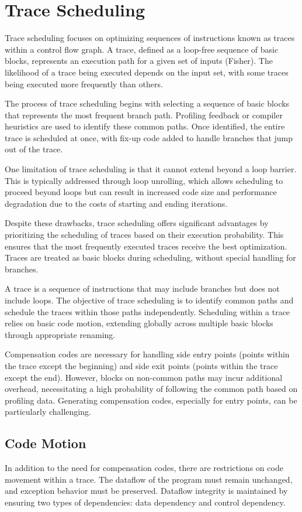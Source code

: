 \section{Trace Scheduling}

Trace scheduling focuses on optimizing sequences of instructions known as traces within a control flow graph. 
A trace, defined as a loop-free sequence of basic blocks, represents an execution path for a given set of inputs (Fisher). 
The likelihood of a trace being executed depends on the input set, with some traces being executed more frequently than others.

The process of trace scheduling begins with selecting a sequence of basic blocks that represents the most frequent branch path. 
Profiling feedback or compiler heuristics are used to identify these common paths. 
Once identified, the entire trace is scheduled at once, with fix-up code added to handle branches that jump out of the trace.

One limitation of trace scheduling is that it cannot extend beyond a loop barrier. 
This is typically addressed through loop unrolling, which allows scheduling to proceed beyond loops but can result in increased code size and performance degradation due to the costs of starting and ending iterations.

Despite these drawbacks, trace scheduling offers significant advantages by prioritizing the scheduling of traces based on their execution probability.
This ensures that the most frequently executed traces receive the best optimization. 
Traces are treated as basic blocks during scheduling, without special handling for branches.

A trace is a sequence of instructions that may include branches but does not include loops. 
The objective of trace scheduling is to identify common paths and schedule the traces within those paths independently. 
Scheduling within a trace relies on basic code motion, extending globally across multiple basic blocks through appropriate renaming.

Compensation codes are necessary for handling side entry points (points within the trace except the beginning) and side exit points (points within the trace except the end). 
However, blocks on non-common paths may incur additional overhead, necessitating a high probability of following the common path based on profiling data. 
Generating compensation codes, especially for entry points, can be particularly challenging.

\subsection{Code Motion}
In addition to the need for compensation codes, there are restrictions on code movement within a trace. 
The dataflow of the program must remain unchanged, and exception behavior must be preserved. 
Dataflow integrity is maintained by ensuring two types of dependencies: data dependency and control dependency.

